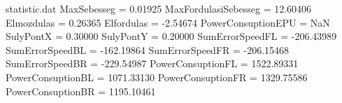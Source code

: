\begin{filecontents*}{statistic.dat}
MaxSebesseg =    0.01925
MaxFordulasiSebesseg =   12.60406
Elmozdulas =    0.26365
Elfordulas =   -2.54674
PowerConsuptionEPU =        NaN
SulyPontX =    0.30000
SulyPontY =    0.20000
SumErrorSpeedFL = -206.43989
SumErrorSpeedBL = -162.19864
SumErrorSpeedFR = -206.15468
SumErrorSpeedBR = -229.54987
PowerConsuptionFL = 1522.89331
PowerConsuptionBL = 1071.33130
PowerConsuptionFR = 1329.75586
PowerConsuptionBR = 1195.10461
\end{filecontents*}
